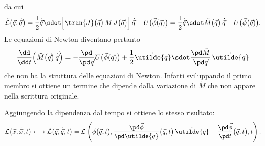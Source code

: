 da cui
\[
	\tilde{\mathcal{L}}\big(\vec{q},\dot{\vec{q}}\big) =\frac{1}{2}\dot{\vec{q}} \sdot\Big[\tran{J}\big(\vec{q}\big)\,M\,J\big(\vec{q}\big)\Big]\,\dot{\vec{q}} - U\big(\vec{\phi}(\vec{q})\big) = \frac{1}{2}\dot{\vec{q}} \sdot \tilde{M}\big(\vec{q}\big)\,\dot{\vec{q}} - U\big(\vec{\phi}\big(\vec{q})\big).
\]
Le equazioni di Newton diventano pertanto
\[
	\frac{\dd}{\dd t}\Big(\tilde{M}\big(\vec{q}\big)\,\dot{\vec{q}}\Big) = -\frac{\pd}{\pd\vec{q}}U\big(\vec{\phi}(\vec{q})\big) + \frac{1}{2}\dot{\utilde{q}} \sdot \frac{\pd\tilde{M}}{\pd\vec{q}}\,\dot{\utilde{q}}
\]
che non ha la struttura delle equazioni di Newton. Infatti sviluppando il primo membro si ottiene un termine che dipende dalla variazione di \(\tilde{M}\) che non appare nella scrittura originale.

\begin{oss}
	Aggiungendo la dipendenza dal tempo si ottiene lo stesso risultato:
	\[
		\mathcal{L}\big(\vec{x},\dot{\vec{x}},t\big) \longleftrightarrow \tilde{\mathcal{L}}\big(\vec{q},\dot{\vec{q}},t\big) = \mathcal{L}\left(\vec{\phi}\big(\vec{q},t\big),\frac{\pd\vec{\phi}}{\pd\utilde{q}}\big(\vec{q},t\big)\,\dot{\utilde{q}}+\frac{\pd\vec{\phi}}{\pd t}\big(\vec{q},t\big),t\right).
	\]
\end{oss}